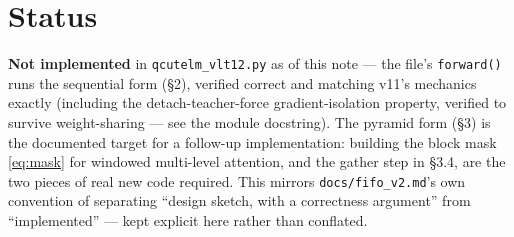 \documentclass[11pt]{article}
\begin{document}
\section{Status}

\textbf{Not implemented} in \texttt{qcutelm\_vlt12.py} as of this note —
the file's \texttt{forward()} runs the sequential form
(\S2), verified correct and matching v11's mechanics exactly (including
the detach-teacher-force gradient-isolation property, verified to survive
weight-sharing — see the module docstring). The pyramid form (\S3) is the
documented target for a follow-up implementation: building the block
mask \eqref{eq:mask} for windowed multi-level attention, and the gather
step in \S3.4, are the two pieces of real new code required. This
mirrors \texttt{docs/fifo\_v2.md}'s own convention of separating ``design
sketch, with a correctness argument'' from ``implemented'' — kept
explicit here rather than conflated.
\end{document}
